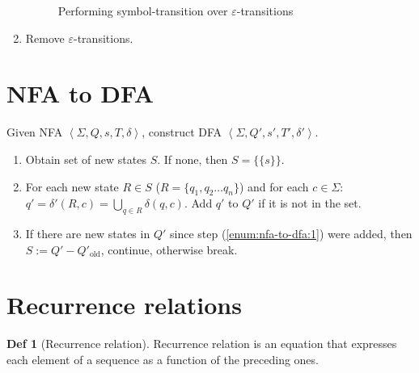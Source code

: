 \documentclass[a4paper]{article}
\theoremstyle{definition}
\newtheorem{definition}{Def}
\begin{document}
\begin{enumerate}
\begin{figure}[!htbp]
    \caption{Performing symbol-transition over \(\varepsilon\)-transitions}%
    \label{fig:enfa-to-nfa-3}
  \end{figure}
  \item Remove \(\varepsilon\)-transitions.
\end{enumerate}

\section{NFA to DFA}
Given NFA \(\left< \Sigma, Q, s, T , \delta\right>\),
construct DFA \(\left< \Sigma, Q', s', T' , \delta' \right>\).

\begin{enumerate}
  \item \label{enum:nfa-to-dfa:1} Obtain set of new states \(S\). If none, then
    \(S = \{\{s\}\}\).
  \item For each new state \(R \in S\) (\(R = \{q_1, q_2 \ldots q_n\}\))
     and for each \(c \in \Sigma\):
     \(q' = \delta'(R, c) = \bigcup_{q \in R} \delta(q, c) \).
     Add \(q'\) to \(Q'\) if it is not in the set.
  \item If there are new states in \(Q'\) since step (\ref{enum:nfa-to-dfa:1})
    were added, then \(S := Q' - Q'_{\text{old}}\), continue, otherwise break.
\end{enumerate}

\section{Recurrence relations}

\begin{definition}[Recurrence relation]
  Recurrence relation is an equation
  that expresses each element of a sequence
  as a function of the preceding ones.
\end{definition}
\end{document}
